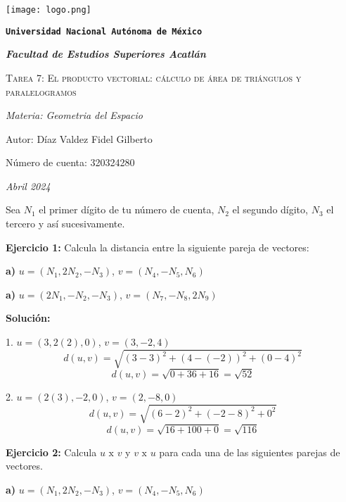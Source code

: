 \documentclass{article}
\begin{document}
\begin{titlepage}
    \centering   
    {\texttt{[image: logo.png]}\par}
    {\texttt{\bfseries \LARGE Universidad Nacional Autónoma de México} \par}
    \vspace{1cm}
    {\itshape \Large \bfseries Facultad de Estudios Superiores Acatlán \par}
    \vspace{3cm}
    {\scshape \Huge Tarea 7: El producto vectorial: cálculo de área de triángulos y paralelogramos \par}
    \vspace {3cm}
    {\slshape \Large Materia: Geometria del Espacio \par}
    \vspace{2cm}
    {\Large Autor: Díaz Valdez Fidel Gilberto\par}
    {\Large Número de cuenta: 320324280\par}
    \vfill
    {\itshape Abril 2024 \par}
 \end{titlepage}

 Sea $N_1$ el primer dígito de tu número de cuenta, $N_2$ el segundo dígito, $N_3$ el tercero y así
sucesivamente.
\vspace{10pt}

\textbf{Ejercicio 1:} Calcula la distancia entre la siguiente pareja de vectores: 
\vspace{10pt}

\textbf{a)} $u = (N_1, 2N_2, -N_3)$, $v = (N_4, -N_5, N_6)$
\vspace{10pt}

\textbf{a)} $u =(2N_1, -N_2, -N_3)$, $v = (N_7, -N_8, 2N_9)$
\vspace{10pt}

\textbf{Solución:}
\vspace{10pt}

1. $u = (3, 2(2), 0)$, $v = (3, -2, 4)$
$$d(u,v) = \sqrt{(3-3)^2+(4-(-2))^2+(0-4)^2}$$
$$d(u,v) = \sqrt{0+36+16} = \sqrt{52}$$

2. $u =(2(3), -2, 0)$, $v = (2, -8, 0)$
$$d(u,v) = \sqrt{(6-2)^2+(-2-8)^2+0^2}$$
$$d(u,v) = \sqrt{16+100+0} = \sqrt{116}$$

\textbf{Ejercicio 2:} Calcula $u\text{ x }v$ y $v\text{ x }u$ para cada una de las siguientes parejas de vectores.    
\vspace{10pt}

\textbf{a)} $u = (N_1, 2N_2, -N_3)$, $v = (N_4, -N_5, N_6)$
\vspace{10pt}
\end{document}
